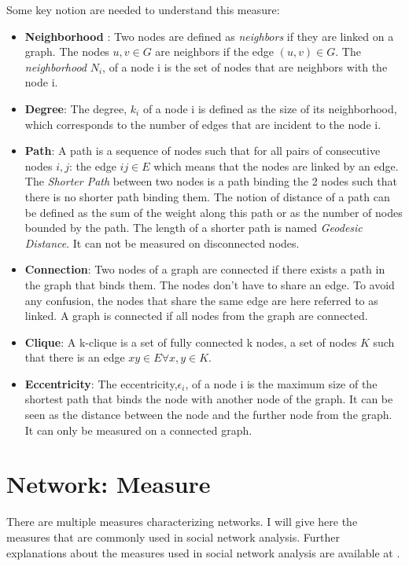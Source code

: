 \documentclass[a4paper, 12pt]{report}
\begin{document}
Some key notion are needed to understand this measure:
\begin{itemize}
\item \textbf{Neighborhood} : Two nodes are defined as \textit{neighbors} if they are linked on a graph. The nodes $u,v \in G$ are neighbors if the edge $(u,v) \in G$. The \textit{neighborhood} $N_i$, of a node i is the set of nodes that are neighbors with the node i.

\item \textbf{Degree}: The degree, $k_i$ of a node i is defined as the size of its neighborhood, which corresponds to the number of edges that are incident to the node i.


\item \textbf{Path}: A path is a sequence of nodes such that for all pairs of consecutive nodes $i,j$: the edge $ij \in E$ which means that the nodes are linked by an edge. The \textit{Shorter Path} between two nodes is a path binding the 2 nodes such that there is no shorter path binding them. The notion of distance of a path can be defined as the sum of the weight along this path or as the number of nodes bounded by the path. The length of a shorter path is named \textit{Geodesic Distance}. It can not be measured on disconnected nodes.

\item \textbf{Connection}: Two nodes of a graph are connected if there exists a path in the graph that binds them. The nodes don't have to share an edge. To avoid any confusion, the nodes that share the same edge are here referred to as linked. A graph is connected if all nodes from the graph are connected.

\item \textbf{Clique}: A k-clique is a set of fully connected k nodes, a set of nodes $K$ such that there is an edge $xy \in E \forall x,y \in K $.

\item \textbf{Eccentricity}: The eccentricity,$\epsilon_i$, of a node i is the maximum size of the shortest path that binds the node with another node of the graph. It can be seen as the distance between the node and the further node from the graph. It can only be measured on a connected graph.

\end{itemize}
\citep{diestel}
\section{Network: Measure}
\label{measure}
There are multiple measures characterizing networks. I will give here the measures that are commonly used in social network analysis. Further explanations about the measures used in social network analysis are available at \cite{SNA_Overview}.
\end{document}

